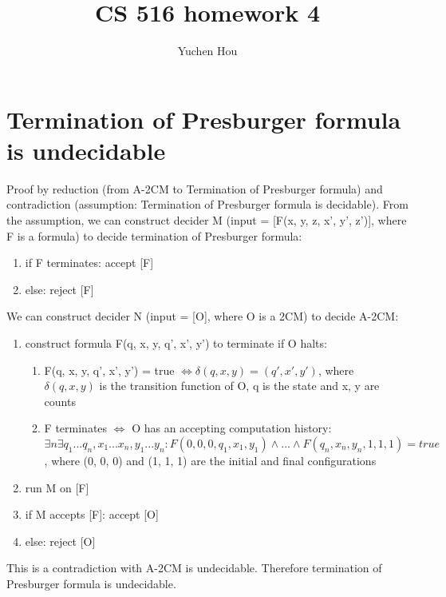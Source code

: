 \documentclass{article}
\begin{document}
\lstset{language=python, tabsize=4}
\title{CS 516 homework 4}
\author{Yuchen Hou}
\maketitle

\section{Termination of Presburger formula is undecidable}
Proof by reduction (from A-2CM to Termination of Presburger formula) and 
contradiction (assumption: Termination of Presburger formula is decidable). 
From the assumption, we can construct decider M (input = [F(x, y, z, x', y', 
z')], where F is a formula) to decide termination of Presburger formula:
\begin{enumerate}
	\item if F terminates: accept [F]
	\item else: reject [F]
\end{enumerate}
We can construct decider N (input = [O], where O is a 2CM) to decide A-2CM:
\begin{enumerate}
	\item construct formula F(q, x, y, q', x', y') to terminate if O halts:
	\begin{enumerate}
		\item F(q, x, y, q', x', y') = true $ \iff \delta(q, x, y) = (q', x', 
		y') $, where $ \delta(q, x, y) $ is the transition function of O, q is 
		the state and x, y are counts
		\item F terminates $ \iff $ O has an accepting computation history: $ 
		\exists n \exists q_1 ... q_n, x_1 ... x_n, y_1 ... y_n : F(0, 0, 0, 
		q_1, x_1, y_1) \land ... \land F(q_n, x_n, y_n, 1, 1, 1) = true$, where 
		(0, 0, 0) and (1, 1, 1) are the initial and final configurations
	\end{enumerate}
	\item run M on [F]
	\item if M accepts [F]: accept [O]
	\item else: reject [O]
\end{enumerate}
This is a contradiction with A-2CM is undecidable. Therefore termination of 
Presburger formula is undecidable.
\end{document}
